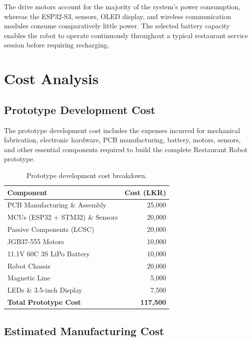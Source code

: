 \documentclass[12pt,a4paper]{article}
\begin{document}
The drive motors account for the majority of the system's power
consumption, whereas the ESP32-S3, sensors, OLED display, and wireless
communication modules consume comparatively little power. The selected
battery capacity enables the robot to operate continuously throughout a
typical restaurant service session before requiring recharging.
\section{Cost Analysis}

\subsection{Prototype Development Cost}

The prototype development cost includes the expenses incurred for
mechanical fabrication, electronic hardware, PCB manufacturing,
battery, motors, sensors, and other essential components required to
build the complete Restaurant Robot prototype.

\begin{table}[H]
\centering
\caption{Prototype development cost breakdown.}
\label{tab:prototype-cost}
\renewcommand{\arraystretch}{1.2}
\begin{tabular}{@{}p{8cm}r@{}}
\toprule
\textbf{Component} & \textbf{Cost (LKR)} \\
\midrule
PCB Manufacturing \& Assembly & 25,000 \\
MCUs (ESP32 + STM32) \& Sensors & 20,000 \\
Passive Components (LCSC) & 20,000 \\
JGB37-555 Motors & 10,000 \\
11.1V 60C 3S LiPo Battery & 10,000 \\
Robot Chassis & 20,000 \\
Magnetic Line & 5,000 \\
LEDs \& 3.5-inch Display & 7,500 \\
\midrule
\textbf{Total Prototype Cost} & \textbf{117,500} \\
\bottomrule
\end{tabular}
\end{table}

\subsection{Estimated Manufacturing Cost}
\end{document}
